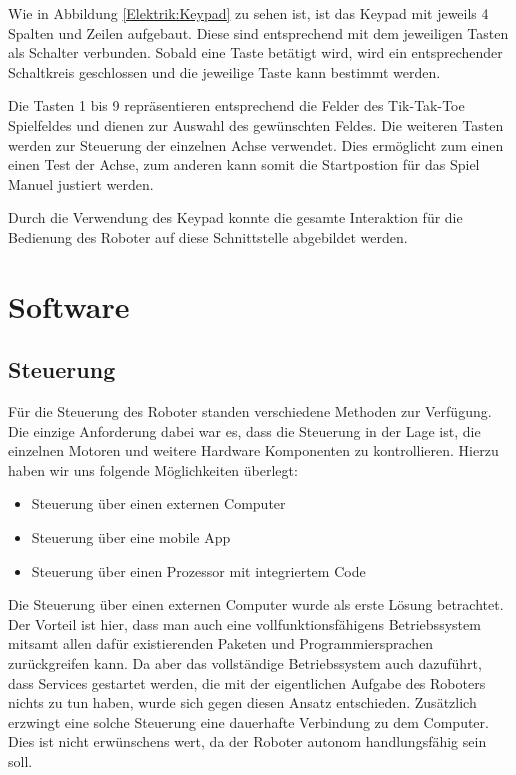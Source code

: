 \documentclass[conference,compsoc,final,a4paper]{IEEEtran}
\begin{document}
Wie in Abbildung \ref{Elektrik:Keypad} zu sehen ist, ist das Keypad mit jeweils 4 Spalten und Zeilen aufgebaut. Diese sind entsprechend mit dem jeweiligen Tasten als Schalter verbunden. 
Sobald eine Taste betätigt wird, wird ein entsprechender Schaltkreis geschlossen und die jeweilige Taste kann bestimmt werden.

Die Tasten 1 bis 9 repräsentieren entsprechend die Felder des Tik-Tak-Toe Spielfeldes und dienen zur Auswahl des gewünschten Feldes. 
Die weiteren Tasten werden zur Steuerung der einzelnen Achse verwendet.
Dies ermöglicht zum einen einen Test der Achse, zum anderen kann somit die Startpostion für das Spiel Manuel justiert werden.

Durch die Verwendung des Keypad konnte die gesamte Interaktion für die Bedienung des Roboter auf diese Schnittstelle abgebildet werden.

\section{Software}

\subsection{Steuerung}
Für die Steuerung des Roboter standen verschiedene Methoden zur Verfügung. Die einzige Anforderung dabei
war es, dass die Steuerung in der Lage ist, die einzelnen Motoren und weitere Hardware Komponenten
zu kontrollieren. Hierzu haben wir uns folgende Möglichkeiten überlegt:

\begin{itemize}
  \item Steuerung über einen externen Computer
  \item Steuerung über eine mobile App
  \item Steuerung über einen Prozessor mit integriertem Code
\end{itemize}

Die Steuerung über einen externen Computer wurde als erste Lösung betrachtet. Der Vorteil
ist hier, dass man auch eine vollfunktionsfähigens Betriebssystem mitsamt allen dafür existierenden
Paketen und Programmiersprachen zurückgreifen kann. Da aber das vollständige Betriebssystem auch
dazuführt, dass Services gestartet werden, die mit der eigentlichen Aufgabe des Roboters nichts zu
tun haben, wurde sich gegen diesen Ansatz entschieden. Zusätzlich erzwingt eine solche Steuerung
eine dauerhafte Verbindung zu dem Computer. Dies ist nicht erwünschens wert, da der Roboter autonom
handlungsfähig sein soll.
\end{document}
